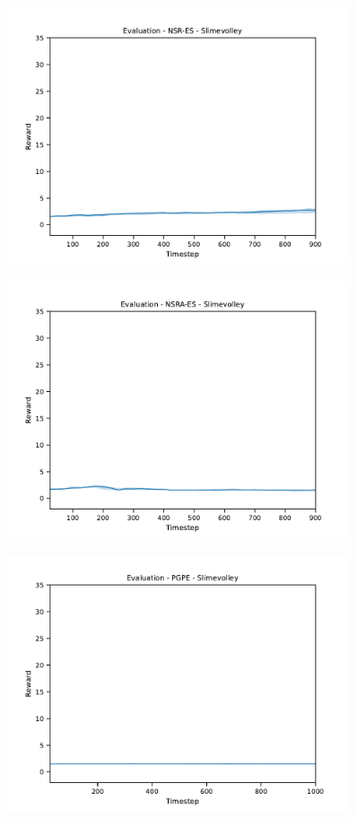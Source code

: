 \begin{figure}[H]
    \includegraphics[width=0.9\textwidth]{img/eval-slime-nsres.pdf}
\end{figure}
\begin{figure}[H]
    \includegraphics[width=0.9\textwidth]{img/eval-slime-nsraes.pdf}
\end{figure}
\begin{figure}[H]
    \includegraphics[width=0.9\textwidth]{img/eval-slime-pepg.pdf}
\end{figure}
\newpage

